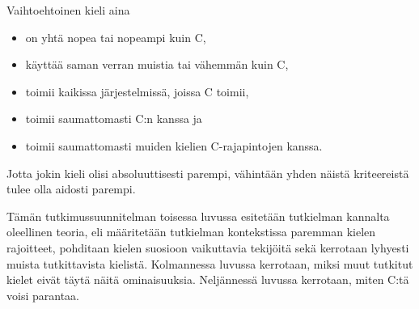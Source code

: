 Vaihtoehtoinen kieli aina
\begin{itemize}[topsep=0pt,itemsep=0pt]
    \item on yhtä nopea tai nopeampi kuin C,
    \item käyttää saman verran muistia tai vähemmän kuin C,
    \item toimii kaikissa järjestelmissä, joissa C toimii,
    \item toimii saumattomasti C:n kanssa ja
    \item toimii saumattomasti muiden kielien C-rajapintojen kanssa.
\end{itemize}
Jotta jokin kieli olisi absoluuttisesti parempi, vähintään yhden näistä
kriteereistä tulee olla aidosti parempi.


Tämän tutkimussuunnitelman toisessa luvussa esitetään tutkielman kannalta
oleellinen teoria, eli määritetään tutkielman kontekstissa paremman kielen
rajoitteet, pohditaan kielen suosioon vaikuttavia tekijöitä sekä kerrotaan
lyhyesti muista tutkittavista kielistä. Kolmannessa luvussa kerrotaan, miksi
muut tutkitut kielet eivät täytä näitä ominaisuuksia. Neljännessä luvussa
kerrotaan, miten C:tä voisi parantaa.
